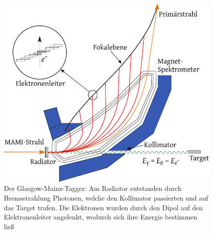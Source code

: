 \documentclass[a4paper,11pt,oneside,final,german,openbib,pdftex]{scrbook}
\begin{document}
{\begin{figure}[h!]
	\begin{center}
	\includegraphics{TAGGER}
	
	\caption{Der Glasgow-Mainz-Tagger: Am Radiator entstanden durch Bremsstrahlung Photonen, welche den Kollimator passierten und auf das Target trafen. Die Elektronen wurden durch den Dipol auf den Elektronenleiter angelenkt, wodurch sich ihre Energie bestimmen lie{\ss}\cite{Un08}}
\label{fig.TAGGER}	
\end{center}
\end{figure}
 
 
}
\end{document}
